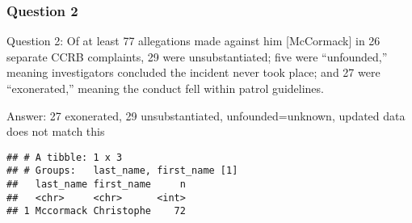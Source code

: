 \documentclass[
]{article}
\newenvironment{Shaded}{\begin{snugshade}}{\end{snugshade}}
\newcommand{\CommentTok}[1]{\textcolor[rgb]{0.56,0.35,0.01}{\textit{#1}}}
\newcommand{\KeywordTok}[1]{\textcolor[rgb]{0.13,0.29,0.53}{\textbf{#1}}}
\newcommand{\NormalTok}[1]{#1}
\newcommand{\OperatorTok}[1]{\textcolor[rgb]{0.81,0.36,0.00}{\textbf{#1}}}
\newcommand{\StringTok}[1]{\textcolor[rgb]{0.31,0.60,0.02}{#1}}
\begin{document}
\hypertarget{question-2}{%
\subsubsection{Question 2}\label{question-2}}

Question 2: Of at least 77 allegations made against him {[}McCormack{]}
in 26 separate CCRB complaints, 29 were unsubstantiated; five were
``unfounded,'' meaning investigators concluded the incident never took
place; and 27 were ``exonerated,'' meaning the conduct fell within
patrol guidelines.

Answer: 27 exonerated, 29 unsubstantiated, unfounded=unknown, updated
data does not match this

\begin{Shaded}
\end{Shaded}

\begin{verbatim}
## # A tibble: 1 x 3
## # Groups:   last_name, first_name [1]
##   last_name first_name     n
##   <chr>     <chr>      <int>
## 1 Mccormack Christophe    72
\end{verbatim}
\end{document}
